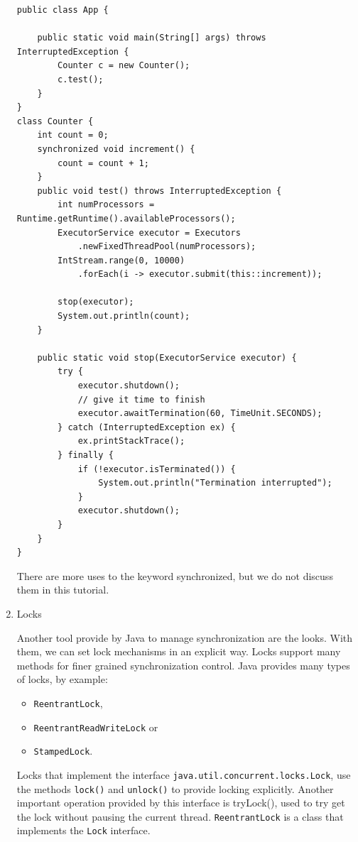 \documentclass{latex/classes/thesis}
\begin{document}
\begin{enumerate}
\begin{lstlisting}
public class App {

    public static void main(String[] args) throws InterruptedException {
        Counter c = new Counter();
        c.test();
    }
}
class Counter {
    int count = 0;
    synchronized void increment() {
        count = count + 1;
    }
    public void test() throws InterruptedException {
        int numProcessors = Runtime.getRuntime().availableProcessors();
        ExecutorService executor = Executors
            .newFixedThreadPool(numProcessors);
        IntStream.range(0, 10000)
            .forEach(i -> executor.submit(this::increment));

        stop(executor);
        System.out.println(count);
    }

    public static void stop(ExecutorService executor) {
        try {
            executor.shutdown();
            // give it time to finish
            executor.awaitTermination(60, TimeUnit.SECONDS);
        } catch (InterruptedException ex) {
            ex.printStackTrace();
        } finally {
            if (!executor.isTerminated()) {
                System.out.println("Termination interrupted");
            }
            executor.shutdown();
        }
    }
}
\end{lstlisting}

There are more uses to the keyword synchronized, but we do not discuss them
in this tutorial.


\item Locks
\label{sec:org646183b}


Another tool provide by Java to manage synchronization are the looks. With
them, we can set lock mechanisms in an explicit way. Locks support many
methods for finer grained synchronization control. Java provides many types
of locks, by  example:
\begin{itemize}
\item \texttt{ReentrantLock},
\item \texttt{ReentrantReadWriteLock} or
\item \texttt{StampedLock}.
\end{itemize}

Locks that implement the interface \texttt{java.util.concurrent.locks.Lock}, use the
methods \texttt{lock()} and \texttt{unlock()} to provide locking explicitly. Another important
operation provided by this interface is tryLock(), used to try get the lock
without pausing the current thread. \texttt{ReentrantLock} is a class that implements
the \texttt{Lock} interface.


\end{enumerate}
\end{document}
